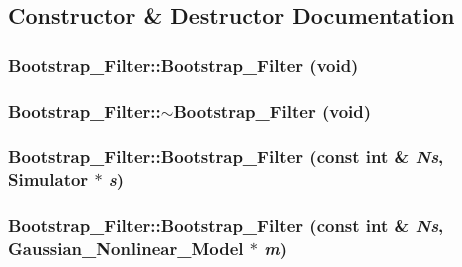 \subsection{Constructor \& Destructor Documentation}
\hypertarget{class_bootstrap___filter_bdebb4e715920561261919a08c0adbe6}{
\subsubsection[{Bootstrap\_\-Filter}]{\setlength{\rightskip}{0pt plus 5cm}Bootstrap\_\-Filter::Bootstrap\_\-Filter (void)}}
\label{class_bootstrap___filter_bdebb4e715920561261919a08c0adbe6}


\hypertarget{class_bootstrap___filter_95cab25094e2488a9c417a40fc7d4afc}{
\subsubsection[{$\sim$Bootstrap\_\-Filter}]{\setlength{\rightskip}{0pt plus 5cm}Bootstrap\_\-Filter::$\sim$Bootstrap\_\-Filter (void)}}
\label{class_bootstrap___filter_95cab25094e2488a9c417a40fc7d4afc}


\hypertarget{class_bootstrap___filter_616427f3269bb6b4e0b23e66e4b748b7}{
\subsubsection[{Bootstrap\_\-Filter}]{\setlength{\rightskip}{0pt plus 5cm}Bootstrap\_\-Filter::Bootstrap\_\-Filter (const int \& {\em Ns}, \/  {\bf Simulator} $\ast$ {\em s})}}
\label{class_bootstrap___filter_616427f3269bb6b4e0b23e66e4b748b7}


\hypertarget{class_bootstrap___filter_b6cd1f6d02e6fb00ba41a7b10b03228a}{
\subsubsection[{Bootstrap\_\-Filter}]{\setlength{\rightskip}{0pt plus 5cm}Bootstrap\_\-Filter::Bootstrap\_\-Filter (const int \& {\em Ns}, \/  {\bf Gaussian\_\-Nonlinear\_\-Model} $\ast$ {\em m})}}
\label{class_bootstrap___filter_b6cd1f6d02e6fb00ba41a7b10b03228a}




